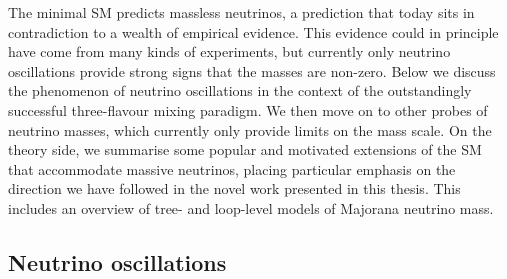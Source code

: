 The minimal SM predicts massless neutrinos, a prediction that today sits in
contradiction to a wealth of empirical evidence. This evidence could in
principle have come from many kinds of experiments, but currently only neutrino
oscillations provide strong signs that the masses are non-zero. Below we discuss
the phenomenon of neutrino oscillations in the context of the outstandingly
successful three-flavour mixing paradigm. We then move on to other probes of
neutrino masses, which currently only provide limits on the mass scale. On the
theory side, we summarise some popular and motivated extensions of the SM that
accommodate massive neutrinos, placing particular emphasis on the direction we
have followed in the novel work presented in this thesis. This includes an
overview of tree- and loop-level models of Majorana neutrino mass.

\subsection{Neutrino oscillations}


